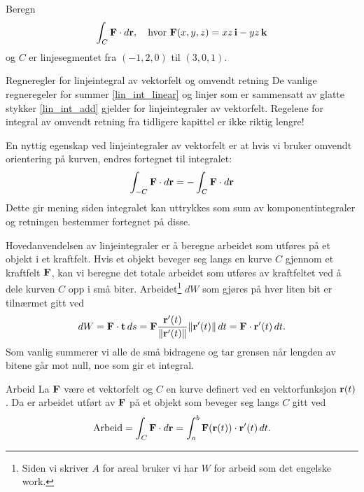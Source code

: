 \begin{eks}{}
Beregn
\[
\int_C \mathbf{F} \cdot d\mathbf{r}, \quad \text{hvor } \mathbf{F}(x, y, z) = xz\, \mathbf{i} - yz\, \mathbf{k}
\]
og \( C \) er linjesegmentet fra \( (-1, 2, 0) \) til \( (3, 0, 1) \).
\end{eks}

\begin{oppsum}{Regneregler for linjeintegral av vektorfelt og omvendt retning}
De vanlige regneregeler for summer \eqref{lin_int_linear} og linjer som er sammensatt av glatte stykker \eqref{lin_int_add} gjelder for linjeintegraler av vektorfelt. Regelene for integral av omvendt retning fra tidligere kapittel er ikke riktig lengre!

En nyttig egenskap ved linjeintegraler av vektorfelt er at hvis vi bruker omvendt orientering på kurven, endres fortegnet til integralet:
\[
\int_{-C} \mathbf{F} \cdot d\mathbf{r} = - \int_C \mathbf{F} \cdot d\mathbf{r}
\]
Dette gir mening siden integralet kan uttrykkes som sum av komponentintegraler og retningen bestemmer fortegnet på disse.
\end{oppsum}

Hovedanvendelsen av linjeintegraler er å beregne arbeidet som utføres på et objekt i et kraftfelt. Hvis et objekt beveger seg langs en kurve $C$ gjennom et kraftfelt $\mathbf{F}$, kan vi beregne det totale arbeidet som utføres av kraftfeltet ved å dele kurven $C$ opp i små biter.  
Arbeidet\footnote{Siden vi skriver $A$ for areal bruker vi har $W$ for arbeid som det engelske work.} $dW$ som gjøres på hver liten bit er tilnærmet gitt ved
\[
dW = \mathbf{F} \cdot \mathbf{t} \, ds = \mathbf{F} \frac{\mathbf{r}'(t)}{\|\mathbf{r}'(t)\|} \|\mathbf{r}'(t)\| \, dt = \mathbf{F} \cdot \mathbf{r}'(t) \, dt.
\]
Som vanlig summerer vi alle de små bidragene og tar grensen når lengden av bitene går mot null, noe som gir et integral.
\begin{defn}{Arbeid}\label{defn:arbeid}
La $\mathbf{F}$ være et vektorfelt og $C$ en kurve definert ved en vektorfunksjon $\mathbf{r}(t)$. Da er arbeidet utført av $\mathbf{F}$ på et objekt som beveger seg langs $C$ gitt ved
\[
\text{Arbeid} = \int_C \mathbf{F} \cdot d\mathbf{r} = \int_a^b \mathbf{F}(\mathbf{r}(t)) \cdot \mathbf{r}'(t) \, dt.\] 
\end{defn}

